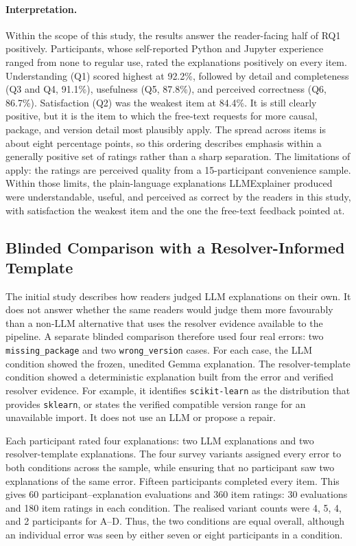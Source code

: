 \paragraph{Interpretation.} Within the scope of this study, the results
answer the reader-facing half of RQ1 positively. Participants, whose
self-reported Python and Jupyter experience ranged from none to regular
use, rated the explanations positively on every item. Understanding (Q1)
scored highest at 92.2\%, followed by detail and completeness (Q3 and Q4,
91.1\%), usefulness (Q5, 87.8\%), and perceived correctness (Q6, 86.7\%).
Satisfaction (Q2) was the weakest item at 84.4\%. It is still clearly
positive, but it is the item to which the free-text requests for more
causal, package, and version detail most plausibly apply. The spread
across items is about eight percentage points, so this ordering describes
emphasis within a generally positive set of ratings rather than a sharp
separation. The limitations of 
apply: the ratings are perceived quality from a 15-participant
convenience sample. Within those limits, the plain-language explanations
LLMExplainer produced were understandable, useful, and perceived as
correct by the readers in this study, with satisfaction the weakest item
and the one the free-text feedback pointed at.

\subsection{Blinded Comparison with a Resolver-Informed Template}
\label{sec:v-human-eval-comparison}

The initial study describes how readers judged LLM explanations on their own.
It does not answer whether the same readers would judge them more favourably
than a non-LLM alternative that uses the resolver evidence available to the
pipeline. A separate blinded comparison therefore used four real errors: two
\texttt{missing\_package} and two \texttt{wrong\_version} cases. For each
case, the LLM condition showed the frozen, unedited Gemma explanation. The
resolver-template condition showed a deterministic explanation built from the
error and verified resolver evidence. For example, it identifies
\texttt{scikit-learn} as the distribution that provides \texttt{sklearn}, or
states the verified compatible version range for an unavailable import. It does
not use an LLM or propose a repair.

Each participant rated four explanations: two LLM explanations and two
resolver-template explanations. The four survey variants assigned every error
to both conditions across the sample, while ensuring that no participant saw
two explanations of the same error. Fifteen participants completed every item.
This gives 60 participant--explanation evaluations and 360 item ratings: 30
evaluations and 180 item ratings in each condition. The realised variant counts
were 4, 5, 4, and 2 participants for A--D. Thus, the two conditions are equal
overall, although an individual error was seen by either seven or eight
participants in a condition.

